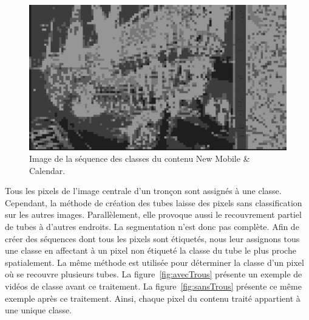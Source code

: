 \begin{figure}[htbp]
	\centering
	\includegraphics[width=0.98\linewidth]{img/chap3/videoClasseMobcalOrdered}
	\caption{Image de la séquence des classes du contenu New Mobile \& Calendar.}
	\label{fig:videoClasse}
\end{figure}

Tous les pixels de l'image centrale d'un tronçon sont assignés à une classe. Cependant, la méthode de création des tubes laisse des pixels sans classification sur les autres images. Parallèlement, elle provoque aussi le recouvrement partiel de tubes à d'autres endroits. La segmentation n'est donc pas complète. Afin de créer des séquences dont tous les pixels sont étiquetés, nous leur assignons tous une classe en affectant à un pixel non étiqueté la classe du tube le plus proche spatialement. La même méthode est utilisée pour déterminer la classe d'un pixel où se recouvre plusieurs tubes. La figure~\ref{fig:avecTrous} présente un exemple de vidéos de classe avant ce traitement. La figure~\ref{fig:sansTrous} présente ce même exemple après ce traitement. Ainsi, chaque pixel du contenu traité appartient à une unique classe.

